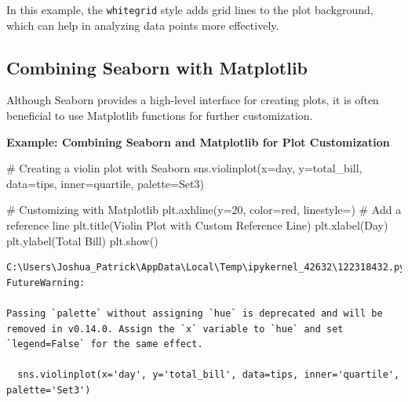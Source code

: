 \documentclass[
  letterpaper,
  DIV=11,
  numbers=noendperiod]{scrreprt}
\newenvironment{Shaded}{\begin{snugshade}}{\end{snugshade}}
\newcommand{\CommentTok}[1]{\textcolor[rgb]{0.37,0.37,0.37}{#1}}
\newcommand{\DecValTok}[1]{\textcolor[rgb]{0.68,0.00,0.00}{#1}}
\newcommand{\NormalTok}[1]{\textcolor[rgb]{0.00,0.23,0.31}{#1}}
\newcommand{\OperatorTok}[1]{\textcolor[rgb]{0.37,0.37,0.37}{#1}}
\newcommand{\StringTok}[1]{\textcolor[rgb]{0.13,0.47,0.30}{#1}}
\begin{document}
In this example, the \texttt{whitegrid} style adds grid lines to the
plot background, which can help in analyzing data points more
effectively.

\hypertarget{combining-seaborn-with-matplotlib}{%
\subsection{Combining Seaborn with
Matplotlib}\label{combining-seaborn-with-matplotlib}}

Although Seaborn provides a high-level interface for creating plots, it
is often beneficial to use Matplotlib functions for further
customization.

\textbf{Example: Combining Seaborn and Matplotlib for Plot
Customization}

\begin{Shaded}
\begin{Highlighting}[]
\CommentTok{\# Creating a violin plot with Seaborn}
\NormalTok{sns.violinplot(x}\OperatorTok{=}\StringTok{\textquotesingle{}day\textquotesingle{}}\NormalTok{, y}\OperatorTok{=}\StringTok{\textquotesingle{}total\_bill\textquotesingle{}}\NormalTok{, data}\OperatorTok{=}\NormalTok{tips, inner}\OperatorTok{=}\StringTok{\textquotesingle{}quartile\textquotesingle{}}\NormalTok{, palette}\OperatorTok{=}\StringTok{\textquotesingle{}Set3\textquotesingle{}}\NormalTok{)}

\CommentTok{\# Customizing with Matplotlib}
\NormalTok{plt.axhline(y}\OperatorTok{=}\DecValTok{20}\NormalTok{, color}\OperatorTok{=}\StringTok{\textquotesingle{}red\textquotesingle{}}\NormalTok{, linestyle}\OperatorTok{=}\StringTok{\textquotesingle{}{-}{-}\textquotesingle{}}\NormalTok{)  }\CommentTok{\# Add a reference line}
\NormalTok{plt.title(}\StringTok{\textquotesingle{}Violin Plot with Custom Reference Line\textquotesingle{}}\NormalTok{)}
\NormalTok{plt.xlabel(}\StringTok{\textquotesingle{}Day\textquotesingle{}}\NormalTok{)}
\NormalTok{plt.ylabel(}\StringTok{\textquotesingle{}Total Bill\textquotesingle{}}\NormalTok{)}
\NormalTok{plt.show()}
\end{Highlighting}
\end{Shaded}

\begin{verbatim}
C:\Users\Joshua_Patrick\AppData\Local\Temp\ipykernel_42632\122318432.py:2: FutureWarning: 

Passing `palette` without assigning `hue` is deprecated and will be removed in v0.14.0. Assign the `x` variable to `hue` and set `legend=False` for the same effect.

  sns.violinplot(x='day', y='total_bill', data=tips, inner='quartile', palette='Set3')
\end{verbatim}
\end{document}
